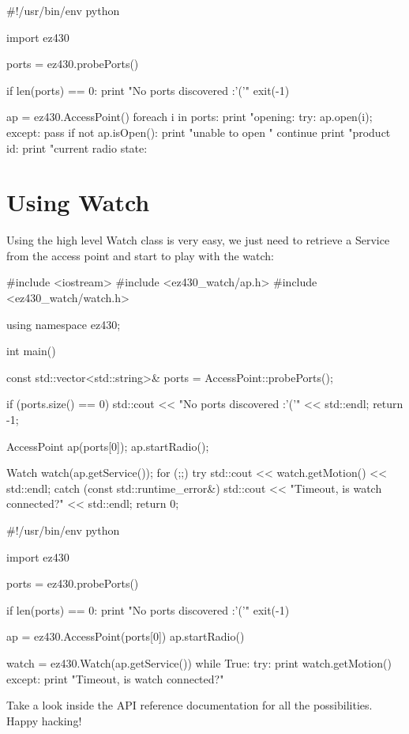 \documentclass[11pt,a4paper]{article}
\begin{document}
\break
\begin{python}
#!/usr/bin/env python

import ez430

ports = ez430.probePorts()

if len(ports) == 0:
	print "No ports discovered :'('"
	exit(-1)

ap = ez430.AccessPoint()
foreach i in ports:
	print "opening: %
	try:
		ap.open(i);
	except:
		pass
	if not ap.isOpen():
		print "unable to open "
		continue
	print "product id: %
	print "current radio state: %
\end{python}

\break
\section{Using Watch}

Using the high level Watch class is very easy,
we just need to retrieve a Service from the access point
and start to play with the watch:

\begin{C++}
#include <iostream>
#include <ez430_watch/ap.h>
#include <ez430_watch/watch.h>

using namespace ez430;

int main()
{
	const std::vector<std::string>& ports = AccessPoint::probePorts();

	if (ports.size() == 0) {
		std::cout << "No ports discovered :'('" << std::endl;
		return -1;
	}

	AccessPoint ap(ports[0]);
	ap.startRadio();
	
	Watch watch(ap.getService());
	for (;;) {
		try {
			std::cout << watch.getMotion() << std::endl;
		}
		catch (const std::runtime_error&) {
			std::cout << "Timeout, is watch connected?" << std::endl;
		}
	}
	return 0;
}
\end{C++}

\break
\begin{python}
#!/usr/bin/env python

import ez430

ports = ez430.probePorts()

if len(ports) == 0:
	print "No ports discovered :'('"
	exit(-1)

ap = ez430.AccessPoint(ports[0])
ap.startRadio()

watch = ez430.Watch(ap.getService())
while True:
	try:
		print watch.getMotion()
	except:
		print "Timeout, is watch connected?"
\end{python}

Take a look inside the API reference documentation
for all the possibilities.\\

Happy hacking!

\end{document}
